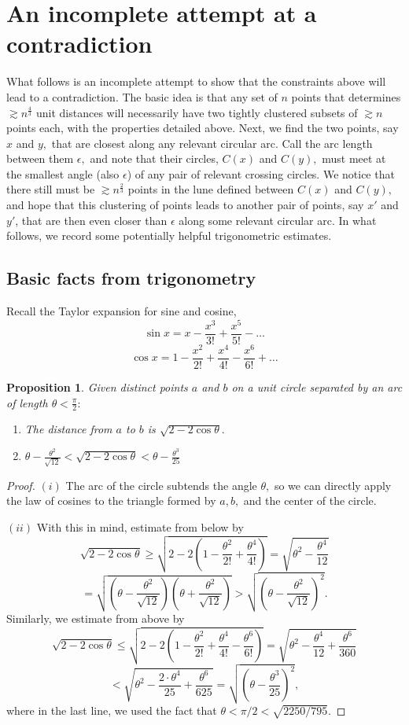 \documentclass[12pt]{article}
\newtheorem{proposition}[theorem]{Proposition}
\begin{document}
\section{An incomplete attempt at a contradiction}
What follows is an incomplete attempt to show that the constraints above will lead to a contradiction. The basic idea is that any set of $n$ points that determines $\gtrsim n^\frac{4}{3}$ unit distances will necessarily have two tightly clustered subsets of $\gtrsim n$ points each, with the properties detailed above. Next, we find the two points, say $x$ and $y,$ that are closest along any relevant circular arc. Call the arc length between them $\epsilon,$ and note that their circles, $C(x)$ and $C(y),$ must meet at the smallest angle (also $\epsilon$) of any pair of relevant crossing circles. We notice that there still must be $\gtrsim n^\frac{2}{3}$ points in the lune defined between $C(x)$ and $C(y),$ and hope that this clustering of points leads to another pair of points, say $x'$ and $y'$, that are then even closer than $\epsilon$ along some relevant circular arc. In what follows, we record some potentially helpful trigonometric estimates.

\subsection{Basic facts from trigonometry}
Recall the Taylor expansion for sine and cosine,
$$\sin x = x-\frac{x^3}{3!}+\frac{x^5}{5!}-\dots$$
$$\cos x = 1-\frac{x^2}{2!}+\frac{x^4}{4!}-\frac{x^6}{6!}+\dots$$

\begin{proposition}\label{distArc}
Given distinct points $a$ and $b$ on a unit circle separated by an arc of length $\theta <\frac{\pi}{2}:$
\begin{enumerate}
\item[(i)] The distance from $a$ to $b$ is $\sqrt{2-2\cos\theta}.$
\item[(ii)] $\theta - \frac{\theta^2}{\sqrt{12}} < \sqrt{2-2\cos\theta} < \theta - \frac{\theta^3}{25}$
\end{enumerate}
\end{proposition}
\begin{proof}
$(i)$ The arc of the circle subtends the angle $\theta,$ so we can directly apply the law of cosines to the triangle formed by $a, b,$ and the center of the circle.

$(ii)$
With this in mind, estimate from below by
$$
\sqrt{2-2\cos \theta} \geq \sqrt{2-2\left(1-\frac{\theta^2}{2!}+\frac{\theta^4}{4!}\right)}=\sqrt{\theta^2-\frac{\theta^4}{12}}
$$
$$
=\sqrt{\left(\theta-\frac{\theta^2}{\sqrt{12}}\right)\left(\theta+\frac{\theta^2}{\sqrt{12}}\right)}> \sqrt{\left(\theta-\frac{\theta^2}{\sqrt{12}}\right)^2}.
$$
Similarly, we estimate from above by
$$
\sqrt{2-2\cos \theta} \leq \sqrt{2-2\left(1-\frac{\theta^2}{2!}+\frac{\theta^4}{4!}-\frac{\theta^6}{6!}\right)}
=\sqrt{\theta^2-\frac{\theta^4}{12}+\frac{\theta^6}{360}}
$$
$$
< \sqrt{\theta^2-\frac{2\cdot\theta^4}{25}+\frac{\theta^6}{625}} = \sqrt{\left(\theta - \frac{\theta^3}{25}\right)^2},
$$
where in the last line, we used the fact that $\theta<\pi/2< \sqrt{2250/795}.$
\end{proof}
\end{document}
